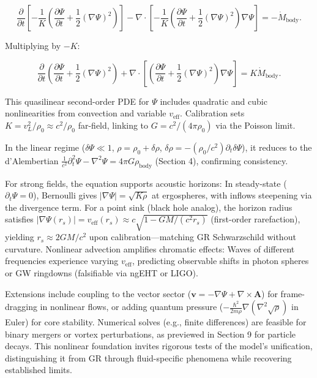 \documentclass{article}
\begin{document}
\[
\frac{\partial}{\partial t} \left[ -\frac{1}{K} \left( \frac{\partial \Psi}{\partial t} + \frac{1}{2} (\nabla \Psi)^2 \right) \right] - \nabla \cdot \left[ -\frac{1}{K} \left( \frac{\partial \Psi}{\partial t} + \frac{1}{2} (\nabla \Psi)^2 \right) \nabla \Psi \right] = -\dot{M}_{\text{body}}.
\]

Multiplying by $-K$:

\[
\frac{\partial}{\partial t} \left( \frac{\partial \Psi}{\partial t} + \frac{1}{2} (\nabla \Psi)^2 \right) + \nabla \cdot \left[ \left( \frac{\partial \Psi}{\partial t} + \frac{1}{2} (\nabla \Psi)^2 \right) \nabla \Psi \right] = K \dot{M}_{\text{body}}.
\]

This quasilinear second-order PDE for $\Psi$ includes quadratic and cubic nonlinearities from convection and variable $v_{\text{eff}}$. Calibration sets $K = v_L^2 / \rho_0 \approx c^2 / \rho_0$ far-field, linking to $G = c^2 / (4\pi \rho_0)$ via the Poisson limit.

In the linear regime ($\delta \Psi \ll 1$, $\rho = \rho_0 + \delta \rho$, $\delta \rho = -(\rho_0 / c^2) \partial_t \delta \Psi$), it reduces to the d'Alembertian $\frac{1}{c^2} \partial_t^2 \Psi - \nabla^2 \Psi = 4\pi G \rho_{\text{body}}$ (Section 4), confirming consistency.

For strong fields, the equation supports acoustic horizons: In steady-state ($\partial_t \Psi = 0$), Bernoulli gives $|\nabla \Psi| = \sqrt{K \rho}$ at ergospheres, with inflows steepening via the divergence term. For a point sink (black hole analog), the horizon radius satisfies $|\nabla \Psi(r_s)| = v_{\text{eff}}(r_s) \approx c \sqrt{1 - GM/(c^2 r_s)}$ (first-order rarefaction), yielding $r_s \approx 2GM/c^2$ upon calibration—matching GR Schwarzschild without curvature. Nonlinear advection amplifies chromatic effects: Waves of different frequencies experience varying $v_{\text{eff}}$, predicting observable shifts in photon spheres or GW ringdowns (falsifiable via ngEHT or LIGO).

Extensions include coupling to the vector sector ($\mathbf{v} = -\nabla \Psi + \nabla \times \mathbf{A}$) for frame-dragging in nonlinear flows, or adding quantum pressure ($-\frac{\hbar^2}{2m \rho} \nabla (\nabla^2 \sqrt{\rho})$ in Euler) for core stability. Numerical solves (e.g., finite differences) are feasible for binary mergers or vortex perturbations, as previewed in Section 9 for particle decays. This nonlinear foundation invites rigorous tests of the model's unification, distinguishing it from GR through fluid-specific phenomena while recovering established limits.
\end{document}
